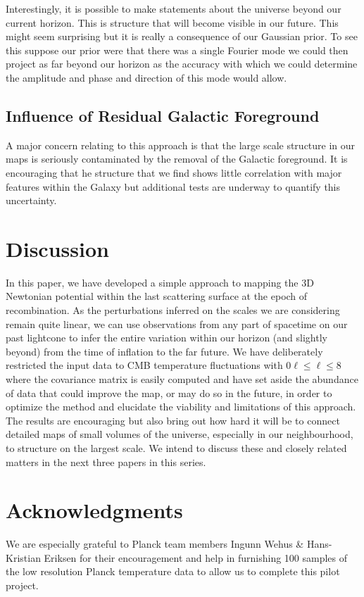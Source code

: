 \documentclass[useAMS,usenatbib,a4paper]{mn2e}
\begin{document}
Interestingly, it is possible to make statements about the universe
beyond our current horizon. This is structure that will become visible
in our future. This might seem surprising but it is really a
consequence of our Gaussian prior. To see this suppose our prior were
that there was a single Fourier mode we could then project as far
beyond our horizon as the accuracy with which we could determine the
amplitude and phase and direction of this mode would allow.

\subsection{Influence of Residual Galactic Foreground}

A major concern relating to this approach is that the large scale
structure in our maps is seriously contaminated by the removal of the
Galactic foreground. It is encouraging that he structure that we find
shows little correlation with major features within the Galaxy but
additional tests are underway to quantify this uncertainty.


\section{Discussion}

In this paper, we have developed a simple approach to mapping the 3D
Newtonian potential within  the last scattering surface at the epoch
of recombination. As the perturbations inferred on the scales we are
considering remain quite linear, we can use observations from any part
of spacetime on our past lightcone to infer the entire variation
within our horizon (and slightly beyond) from the time of inflation to
the far future. We have deliberately restricted the input data to CMB
temperature fluctuations with $0\ell\leq\ell\leq8$ where the
covariance matrix is easily computed and have set aside the abundance
of data that could improve the map, or may do so in the future, in
order to optimize the method and elucidate the viability and
limitations of this approach. The results are encouraging but also
bring out how hard it will be to connect detailed maps of small
volumes of the universe, especially in our neighbourhood, to structure
on the largest scale. We intend to discuss these and closely related
matters in the next three papers in this series.


\section*{Acknowledgments}

We are especially grateful to Planck team members Ingunn Wehus \&
Hans-Kristian Eriksen for their encouragement and help in furnishing
100 samples of the low resolution Planck temperature data to allow us
to complete this pilot project.



\end{document}
